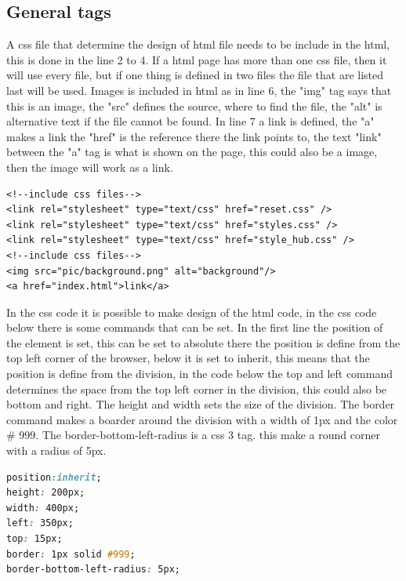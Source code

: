 \subsection{General tags}
A css file that determine the design of html file needs to be include in the html, this is done in the line 2 to 4. If a html page has more than one css file, then it will use every file, but if one thing is defined in two files the file that are listed last will be used. Images is included in html as in line 6, the "img" tag says that this is an image, the "src" defines the source, where to find the file, the "alt" is alternative text if the file cannot be found. In line 7 a link is defined, the "a" makes a link the "href" is the reference there the link points to, the text "link" between the "a" tag is what is shown on the page, this could also be a image, then the image will work as a link.
\begin{lstlisting}
<!--include css files-->
<link rel="stylesheet" type="text/css" href="reset.css" />
<link rel="stylesheet" type="text/css" href="styles.css" />
<link rel="stylesheet" type="text/css" href="style_hub.css" />
<!--include css files-->
<img src="pic/background.png" alt="background"/>
<a href="index.html">link</a>
\end{lstlisting}
In the css code it is possible to make design of the html code, in the css code below there is some commands that can be set. In the first line the position of the element is set, this can be set to absolute there the position is define from the top left corner of the browser, below it is set to inherit, this means that the position is define from the division, in the code below the top and left command determines the space from the top left corner in the division, this could also be bottom and right. The height and width sets the size of the division. The border command makes a boarder around the division with a width of 1px and the color \# 999. The border-bottom-left-radius is a css 3 tag. this make a round corner with a radius of 5px.
\begin{lstlisting}[language=CSS]
position:inherit;
height: 200px;
width: 400px;
left: 350px;
top: 15px;
border: 1px solid #999;
border-bottom-left-radius: 5px;
\end{lstlisting}